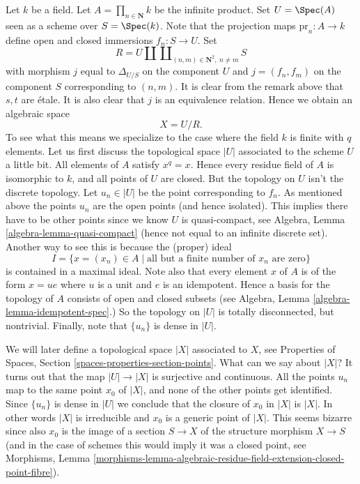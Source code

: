 \begin{example}
\label{example-infinite-product}
Let $k$ be a field.
Let $A = \prod_{n \in \mathbf{N}} k$ be the infinite product.
Set $U = \Spec(A)$ seen as a scheme over $S = \Spec(k)$.
Note that the projection maps $\text{pr}_n : A \to k$ define open
and closed immersions $f_n : S \to U$. Set
$$
R = U \amalg \coprod\nolimits_{(n, m) \in \mathbf{N}^2, \ n \not = m} S
$$
with morphism $j$ equal to $\Delta_{U/S}$ on the component $U$
and $j = (f_n, f_m)$ on the component $S$ corresponding to $(n, m)$.
It is clear from the remark above that $s, t$ are \'etale.
It is also clear that $j$ is an equivalence relation. Hence we
obtain an algebraic space
$$
X = U/R.
$$
To see what this means we specialize to the case where
the field $k$ is finite with $q$ elements. Let us first
discuss the topological space $|U|$ associated to the scheme $U$
a little bit. All elements of $A$ satisfy $x^q = x$.
Hence every residue field of $A$ is isomorphic to $k$, and
all points of $U$ are closed. But the topology on $U$ isn't
the discrete topology. Let $u_n \in |U|$ be the point corresponding
to $f_n$. As mentioned above the points $u_n$ are
the open points (and hence isolated). This implies there have
to be other points since we know $U$ is quasi-compact, see
Algebra, Lemma \ref{algebra-lemma-quasi-compact}
(hence not equal to an infinite discrete set).
Another way to see this is because the (proper) ideal
$$
I =
\{x = (x_n) \in A \mid \text{all but a finite number of }x_n\text{ are zero}\}
$$
is contained in a maximal ideal. Note also that every element
$x$ of $A$ is of the form $x = ue$ where $u$ is a unit and $e$ is an
idempotent. Hence a basis for the topology of $A$ consists of open and
closed subsets (see Algebra, Lemma \ref{algebra-lemma-idempotent-spec}.)
So the topology on $|U|$ is totally disconnected, but nontrivial.
Finally, note that $\{u_n\}$ is dense in $|U|$.

\medskip\noindent
We will later define a topological space $|X|$ associated to $X$, see
Properties of Spaces, Section \ref{spaces-properties-section-points}.
What can we say about $|X|$?
It turns out that the map $|U| \to |X|$ is surjective and continuous.
All the points $u_n$ map to the same point $x_0$ of $|X|$, and none of
the other points get identified. Since $\{u_n\}$ is dense in $|U|$ we
conclude that the closure of $x_0$ in $|X|$ is $|X|$. In other words
$|X|$ is irreducible and $x_0$ is a generic point of $|X|$. This seems
bizarre since also $x_0$ is the image of a section
$S \to X$ of the structure morphism $X \to S$ (and in the case of
schemes this would imply it was a closed point, see
Morphisms, Lemma
\ref{morphisms-lemma-algebraic-residue-field-extension-closed-point-fibre}).
\end{example}

